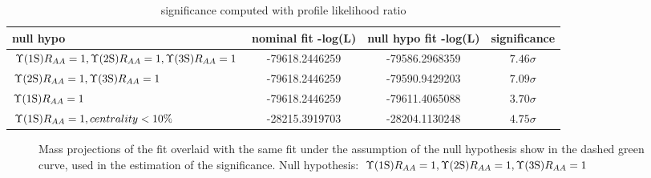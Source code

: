 \begin{table}[!h]
  \centering
  \caption{\raa significance computed with profile likelihood ratio}
  \begin{tabular}{l|cc|c}
    \hline
     null hypo   & nominal fit -log(L) & null hypo fit -log(L) & significance \\
     \hline
     $\Upsilon\text{(1S)} R_{AA} = 1, \Upsilon\text{(2S)} R_{AA} = 1, \Upsilon\mathrm{(3S)} R_{AA} = 1$ & -79618.2446259 & -79586.2968359 & $7.46 \sigma$ \\
     $\Upsilon\text{(2S)} R_{AA} = 1, \Upsilon\mathrm{(3S)} R_{AA} = 1$ & -79618.2446259 & -79590.9429203 & $7.09 \sigma$ \\
     $\Upsilon\text{(1S)} R_{AA} = 1$ & -79618.2446259 & -79611.4065088 & $3.70 \sigma$ \\
     $\Upsilon\text{(1S)} R_{AA} = 1, centrality < 10\% $ & -28215.3919703 & -28204.1130248 & $4.75 \sigma$ \\
    \hline
  \end{tabular}
  \label{tab:raa_significance}
\end{table}


\begin{figure}
\begin{center}
\caption{Mass projections of the fit overlaid with the same fit under the assumption of the null hypothesis show in the dashed green curve, used in the estimation of the significance. Null hypothesis: $\Upsilon\text{(1S)} R_{AA} = 1, \Upsilon\text{(2S)} R_{AA} = 1, \Upsilon\mathrm{(3S)} R_{AA} = 1$ }
\label{fig:raa_YnsSignif}
\end{center}
\end{figure}

